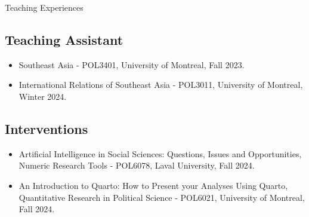 \documentclass{resume} %
\begin{document}
\begin{rSection}{Teaching Experiences}
    \subsection*{Teaching Assistant}
        \begin{itemize}
            \item Southeast Asia - POL3401, University of Montreal, Fall 2023.
            \item International Relations of Southeast Asia - POL3011, University of Montreal, Winter 2024.
        \end{itemize}
    \subsection*{Interventions}
        \begin{itemize}
            \item Artificial Intelligence in Social Sciences: Questions, Issues and Opportunities, Numeric Research Tools - POL6078, Laval University, Fall 2024.
            \item An Introduction to Quarto: How to Present your Analyses Using Quarto, Quantitative Research in Political Science - POL6021, University of Montreal, Fall 2024.
        \end{itemize}
        
\end{rSection}

\end{document}
